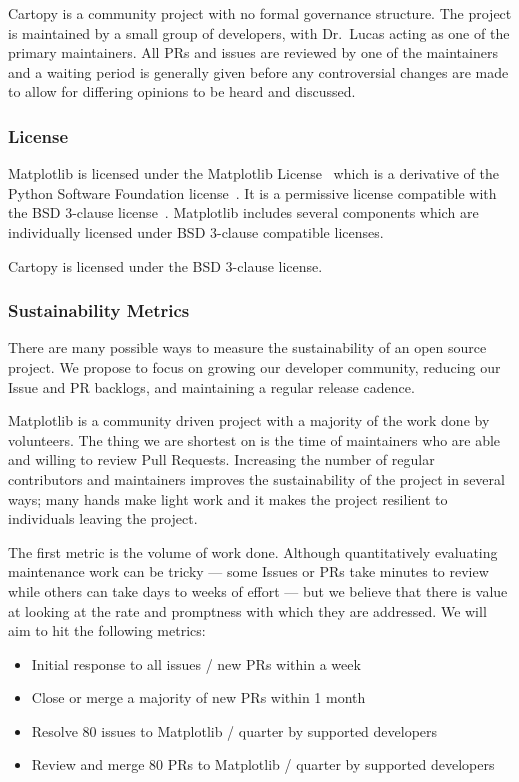 \documentclass[12pt]{article}
\numberwithin{page}{section}
\begin{document}
Cartopy is a community project with no formal governance structure.  The
project is maintained by a small group of developers, with Dr.\ Lucas acting as
one of the primary maintainers.  All PRs and issues are reviewed by one of the
maintainers and a waiting period is generally given before any controversial
changes are made to allow for differing opinions to be heard and discussed.

\subsubsection{License}

Matplotlib is licensed under the Matplotlib License~\cite{mpl_lic} which is a
derivative of the Python Software Foundation license~\cite{psf_lic}.  It is a
permissive license compatible with the BSD 3-clause
license~\cite{jdh_bsd_opinions}.  Matplotlib includes several components which
are individually licensed under BSD 3-clause compatible licenses.

Cartopy is licensed under the BSD 3-clause license.


\subsubsection{Sustainability Metrics}
\label{sec:sm}
There are many possible ways to measure the sustainability of an
open source project.  We propose to focus on growing our developer
community, reducing our Issue and PR backlogs, and maintaining a
regular release cadence.

Matplotlib is a community driven project with a majority of the
work done by volunteers.  The thing we are shortest on is the time of
maintainers who are able and willing to review Pull Requests.
Increasing the number of regular contributors and maintainers improves
the sustainability of the project in several ways; many hands make
light work and it makes the project resilient to individuals leaving
the project.

The first metric is the volume of work done.  Although quantitatively
evaluating maintenance work can be tricky --- some Issues or PRs take minutes
to review while others can take days to weeks of effort --- but we believe that
there is value at looking at the rate and promptness with which they are
addressed.  We will aim to hit the following metrics:
\begin{itemize}[noitemsep]
\item Initial response to all issues / new PRs within a week  %
\item Close or merge a majority of new PRs within 1 month     %
\item Resolve 80 issues to Matplotlib / quarter by supported developers       %
\item Review and merge 80 PRs to Matplotlib / quarter by supported developers %
\end{itemize}
\end{document}
